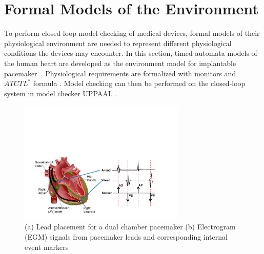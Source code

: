 	\vspace{-10pt}
\section{Formal Models of the Environment}
\label{formalModelsofEnv}
To perform closed-loop model checking of medical devices, formal models of their physiological environment are needed to represent different physiological conditions the devices may encounter. In this section, timed-automata \cite{timed_automata} models of the human heart are developed as the environment model for implantable pacemaker~\cite{sttt13,VHM_proc}. Physiological requirements are formalized with monitors and $ATCTL^*$ formula \cite{TCTL}. 
Model checking can then be performed on the closed-loop system in model checker UPPAAL \cite{uppaal}. %
 \begin{figure}[!t]
	\centering
	\includegraphics[width=0.7\textwidth]{figs/egm.pdf}
	
	\caption{\small (a) Lead placement for a dual chamber pacemaker (b) Electrogram (EGM) signals from pacemaker leads and corresponding internal event markers}
	\label{fig:probes}
	\vspace{-10pt}
\end{figure} 

